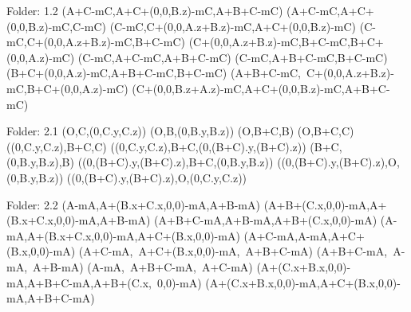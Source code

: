 Folder: 1.2
\left(A+C-mC,A+C+\left(0,0,B.z\right)-mC,A+B+C-mC\right)
\left(A+C-mC,A+C+\left(0,0,B.z\right)-mC,C-mC\right)
\left(C-mC,C+\left(0,0,A.z+B.z\right)-mC,A+C+\left(0,0,B.z\right)-mC\right)
\left(C-mC,C+\left(0,0,A.z+B.z\right)-mC,B+C-mC\right)
\left(C+\left(0,0,A.z+B.z\right)-mC,B+C-mC,B+C+\left(0,0,A.z\right)-mC\right)
\left(C-mC,A+C-mC,A+B+C-mC\right)
\left(C-mC,A+B+C-mC,B+C-mC\right)
\left(B+C+\left(0,0,A.z\right)-mC,A+B+C-mC,B+C-mC\right)
\left(A+B+C-mC,\ C+\left(0,0,A.z+B.z\right)-mC,B+C+\left(0,0,A.z\right)-mC\right)
\left(C+\left(0,0,B.z+A.z\right)-mC,A+C+\left(0,0,B.z\right)-mC,A+B+C-mC\right)

Folder: 2.1
\left(O,C,\left(0,C.y,C.z\right)\right)
\left(O,B,\left(0,B.y,B.z\right)\right)
\left(O,B+C,B\right)
\left(O,B+C,C\right)
\left(\left(0,C.y,C.z\right),B+C,C\right)
\left(\left(0,C.y,C.z\right),B+C,\left(0,\left(B+C\right).y,\left(B+C\right).z\right)\right)
\left(B+C,\left(0,B.y,B.z\right),B\right)
\left(\left(0,\left(B+C\right).y,\left(B+C\right).z\right),B+C,\left(0,B.y,B.z\right)\right)
\left(\left(0,\left(B+C\right).y,\left(B+C\right).z\right),O,\left(0,B.y,B.z\right)\right)
\left(\left(0,\left(B+C\right).y,\left(B+C\right).z\right),O,\left(0,C.y,C.z\right)\right)

Folder: 2.2
\left(A-mA,A+\left(B.x+C.x,0,0\right)-mA,A+B-mA\right)
\left(A+B+\left(C.x,0,0\right)-mA,A+\left(B.x+C.x,0,0\right)-mA,A+B-mA\right)
\left(A+B+C-mA,A+B-mA,A+B+\left(C.x,0,0\right)-mA\right)
\left(A-mA,A+\left(B.x+C.x,0,0\right)-mA,A+C+\left(B.x,0,0\right)-mA\right)
\left(A+C-mA,A-mA,A+C+\left(B.x,0,0\right)-mA\right)
\left(A+C-mA,\ A+C+\left(B.x,0,0\right)-mA,\ A+B+C-mA\right)
\left(A+B+C-mA,\ A-mA,\ A+B-mA\right)
\left(A-mA,\ A+B+C-mA,\ A+C-mA\right)
\left(A+\left(C.x+B.x,0,0\right)-mA,A+B+C-mA,A+B+\left(C.x,\ 0,0\right)-mA\right)
\left(A+\left(C.x+B.x,0,0\right)-mA,A+C+\left(B.x,0,0\right)-mA,A+B+C-mA\right)


